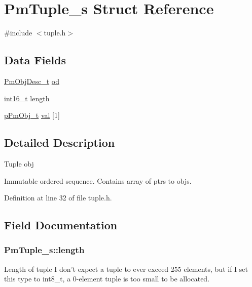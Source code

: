 \hypertarget{struct_pm_tuple__s}{\section{Pm\-Tuple\-\_\-s Struct Reference}
\label{struct_pm_tuple__s}
}


{\ttfamily \#include $<$tuple.\-h$>$}

\subsection*{Data Fields}
\begin{DoxyCompactItemize}
\item 
\hyperlink{obj_8h_a72d816790acd8eb550fb25268c2b3489}{Pm\-Obj\-Desc\-\_\-t} \hyperlink{struct_pm_tuple__s_a851e65283535fbe9e7025444210badab}{od}
\item 
\hyperlink{stdint_8h_aa343fa3b3d06292b959ffdd4c4703b06}{int16\-\_\-t} \hyperlink{struct_pm_tuple__s_a38e1063d1e9a76236b6cfae941092175}{length}
\item 
\hyperlink{obj_8h_af293479fa3f9d92b941ee7445ad3960e}{p\-Pm\-Obj\-\_\-t} \hyperlink{struct_pm_tuple__s_a63378a6cdefc6c883e4cc0c743a5df95}{val} \mbox{[}1\mbox{]}
\end{DoxyCompactItemize}


\subsection{Detailed Description}
Tuple obj

Immutable ordered sequence. Contains array of ptrs to objs. 

Definition at line 32 of file tuple.\-h.



\subsection{Field Documentation}
\hypertarget{struct_pm_tuple__s_a38e1063d1e9a76236b6cfae941092175}{
\subsubsection[{length}]{ Pm\-Tuple\-\_\-s\-::length}}\label{struct_pm_tuple__s_a38e1063d1e9a76236b6cfae941092175}
Length of tuple I don't expect a tuple to ever exceed 255 elements, but if I set this type to int8\-\_\-t, a 0-\/element tuple is too small to be allocated. 

